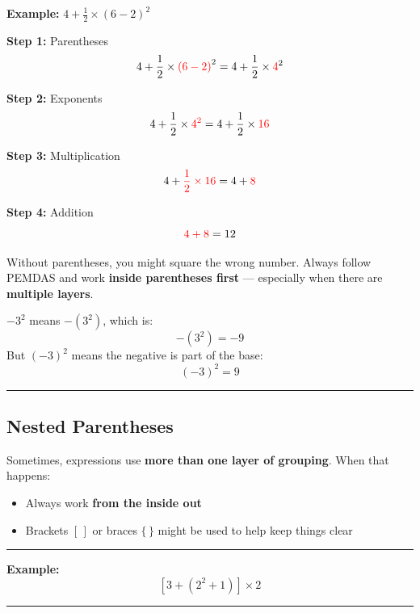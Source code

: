 \documentclass[
  letterpaper,
  DIV=11,
  numbers=noendperiod]{scrreprt}
\providecommand{\tightlist}{%
  \setlength{\itemsep}{0pt}\setlength{\parskip}{0pt}}
\begin{document}
\textbf{Example:} \(4 + \frac{1}{2} \times (6 - 2)^2\)

\textbf{Step 1:} Parentheses\\
\[
4 + \frac{1}{2} \times \color{red}{(6 - 2)}^{\color{black}2} \color{black} = 4 + \frac{1}{2} \times \color{red}{4}\color{black}^{2}
\]

\textbf{Step 2:} Exponents\\
\[
4 + \frac{1}{2} \times \color{red}{4^2}\color{black} = 4 + \frac{1}{2} \times \color{red}{16}
\]

\textbf{Step 3:} Multiplication \[
4 + \color{red}{\frac{1}{2} \times 16}\color{black} = 4 + \color{red}{8}
\]

\textbf{Step 4:} Addition \[
\color{red}{4 + 8}\color{black} = 12
\]

Without parentheses, you might square the wrong number. Always follow
PEMDAS and work \textbf{inside parentheses first} --- especially when
there are \textbf{multiple layers}.

\(-3^2\) means \(-(3^2)\), which is: \[
-(3^2) = -9
\] But \((-3)^2\) means the negative is part of the base: \[
(-3)^2 = 9
\]

\begin{center}\rule{0.5\linewidth}{0.5pt}\end{center}

\subsection*{Nested Parentheses}\label{nested-parentheses}

Sometimes, expressions use \textbf{more than one layer of grouping}.
When that happens:

\begin{itemize}
\tightlist
\item
  Always work \textbf{from the inside out}
\item
  Brackets \([\,]\) or braces \(\{\,\}\) might be used to help keep
  things clear
\end{itemize}

\begin{center}\rule{0.5\linewidth}{0.5pt}\end{center}

\textbf{Example:}\\
\[
\left[ 3 + (2^2 + 1) \right] \times 2
\]

\begin{center}\rule{0.5\linewidth}{0.5pt}\end{center}
\end{document}

